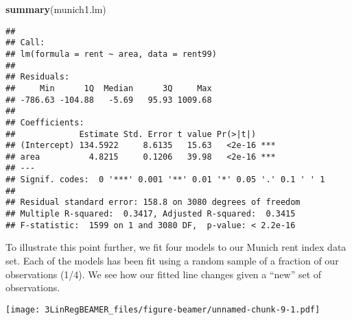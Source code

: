 \documentclass[ignorenonframetext,]{beamer}
\newenvironment{Shaded}{\begin{snugshade}}{\end{snugshade}}
\newcommand{\KeywordTok}[1]{\textcolor[rgb]{0.13,0.29,0.53}{\textbf{#1}}}
\newcommand{\NormalTok}[1]{#1}
\begin{document}
\begin{frame}[fragile]

\small

\begin{Shaded}
\begin{Highlighting}[]
\KeywordTok{summary}\NormalTok{(munich1.lm)}
\end{Highlighting}
\end{Shaded}

\begin{verbatim}
## 
## Call:
## lm(formula = rent ~ area, data = rent99)
## 
## Residuals:
##     Min      1Q  Median      3Q     Max 
## -786.63 -104.88   -5.69   95.93 1009.68 
## 
## Coefficients:
##             Estimate Std. Error t value Pr(>|t|)    
## (Intercept) 134.5922     8.6135   15.63   <2e-16 ***
## area          4.8215     0.1206   39.98   <2e-16 ***
## ---
## Signif. codes:  0 '***' 0.001 '**' 0.01 '*' 0.05 '.' 0.1 ' ' 1
## 
## Residual standard error: 158.8 on 3080 degrees of freedom
## Multiple R-squared:  0.3417, Adjusted R-squared:  0.3415 
## F-statistic:  1599 on 1 and 3080 DF,  p-value: < 2.2e-16
\end{verbatim}

\normalsize

\end{frame}

\begin{frame}

To illustrate this point further, we fit four models to our Munich rent
index data set. Each of the models has been fit using a random sample of
a fraction of our observations (1/4). We see how our fitted line changes
given a ``new'' set of observations.

\texttt{[image: 3LinRegBEAMER\_files/figure-beamer/unnamed-chunk-9-1.pdf]}

\end{frame}
\end{document}
